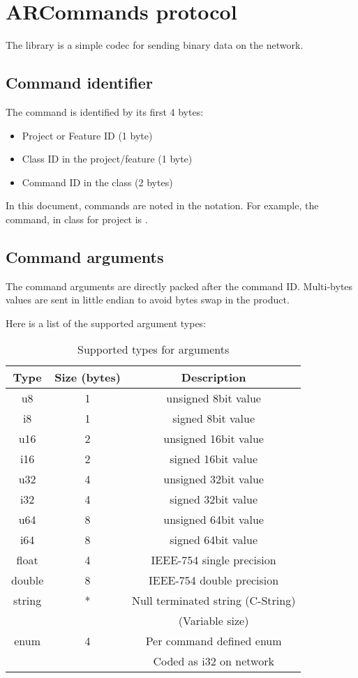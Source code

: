 \section{ARCommands protocol}

The  library is a simple codec for sending binary data on the network.

\subsection{Command identifier}

The command is identified by its first 4 bytes:
\begin{itemize}
\item{Project or Feature ID (1 byte)}
\item{Class ID in the project/feature (1 byte)}
\item{Command ID in the class (2 bytes)}
\end{itemize}

In this document, commands are noted in the  notation. For example, the  command, in class  for project  is .

\subsection{Command arguments}

The command arguments are directly packed after the command ID. Multi-bytes values are sent in little endian to avoid bytes swap in the product.

Here is a list of the supported argument types:
\begin{table}[h]
\centering
\begin{tabular}{|c|c|c|}
  \hline
  Type & Size (bytes) & Description \\
  \hline
  \hline
  u8 & 1 & unsigned 8bit value \\
  i8 & 1 & signed 8bit value \\
  \hline
  u16 & 2 & unsigned 16bit value \\
  i16 & 2 & signed 16bit value \\
  \hline
  u32 & 4 & unsigned 32bit value \\
  i32 & 4 & signed 32bit value \\
  \hline
  u64 & 8 & unsigned 64bit value \\
  i64 & 8 & signed 64bit value \\
  \hline
  float & 4 & IEEE-754 single precision \\
  double & 8 & IEEE-754 double precision \\
  \hline
  string & * & Null terminated string (C-String) \\
       & & (Variable size)\\
  \hline
  enum & 4 & Per command defined enum \\
       & & Coded as i32 on network \\
  \hline
\end{tabular}
\caption{Supported types for  arguments}
\end{table}

